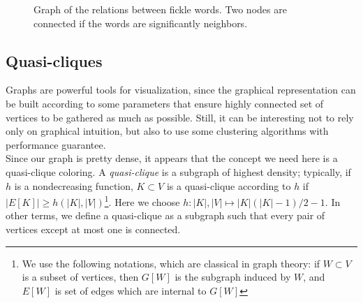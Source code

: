\documentclass[preprint]{elsarticle}
\begin{document}
\begin{figure}[h!]

\caption{Graph of the relations between fickle words. Two nodes are connected if the words are significantly neighbors.}
\label{fig:graph1}
\end{figure}

\subsection{Quasi-cliques}

Graphs are powerful tools for visualization, since the graphical representation can be built according to some parameters that ensure highly connected set of vertices to be gathered as much as possible. Still, it can be interesting not to rely only on graphical intuition, but also to use some clustering algorithms with performance guarantee.\\

Since our graph is pretty dense, it appears that the concept we need here is a quasi-clique coloring. A \textit{quasi-clique} is a subgraph of highest density; typically, if $h$ is a nondecreasing function, $K \subset V$ is a quasi-clique according to $h$ if $|E[K]| \geq h(|K|,|V|)$\footnote{We use the following notations, which are classical in graph theory: if $W\subset V$ is a subset of vertices, then $G[W]$ is the subgraph induced by $W$, and $E[W]$ is set of edges which are internal to $G[W]$}. Here we choose $h:|K|,|V|\mapsto|K|(|K|-1)/2-1$. In other terms, we define a quasi-clique as a subgraph such that every pair of vertices except at most one is connected.\\
\end{document}
